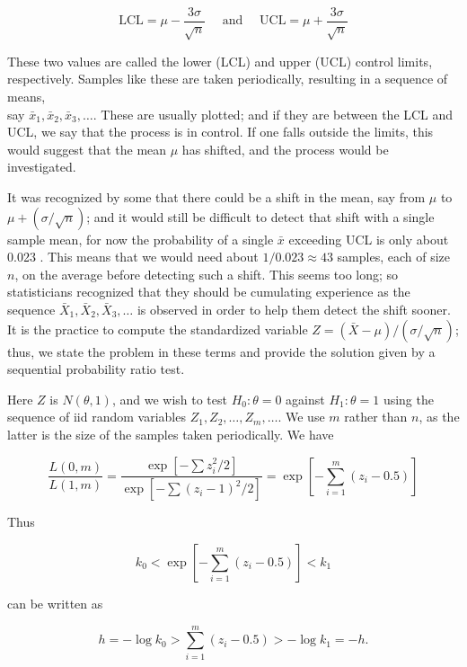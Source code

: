 $$
\mathrm{LCL}=\mu-\frac{3 \sigma}{\sqrt{n}} \quad \text { and } \quad \mathrm{UCL}=\mu+\frac{3 \sigma}{\sqrt{n}}
$$

These two values are called the lower (LCL) and upper (UCL) control limits, respectively. Samples like these are taken periodically, resulting in a sequence of means,\\
say $\bar{x}_{1}, \bar{x}_{2}, \bar{x}_{3}, \ldots$. These are usually plotted; and if they are between the LCL and UCL, we say that the process is in control. If one falls outside the limits, this would suggest that the mean $\mu$ has shifted, and the process would be investigated.

It was recognized by some that there could be a shift in the mean, say from $\mu$ to $\mu+(\sigma / \sqrt{n})$; and it would still be difficult to detect that shift with a single sample mean, for now the probability of a single $\bar{x}$ exceeding UCL is only about 0.023 . This means that we would need about $1 / 0.023 \approx 43$ samples, each of size $n$, on the average before detecting such a shift. This seems too long; so statisticians recognized that they should be cumulating experience as the sequence $\bar{X}_{1}, \bar{X}_{2}, \bar{X}_{3}, \ldots$ is observed in order to help them detect the shift sooner. It is the practice to compute the standardized variable $Z=(\bar{X}-\mu) /(\sigma / \sqrt{n})$; thus, we state the problem in these terms and provide the solution given by a sequential probability ratio test.

Here $Z$ is $N(\theta, 1)$, and we wish to test $H_{0}: \theta=0$ against $H_{1}: \theta=1$ using the sequence of iid random variables $Z_{1}, Z_{2}, \ldots, Z_{m}, \ldots$. We use $m$ rather than $n$, as the latter is the size of the samples taken periodically. We have

$$
\frac{L(0, m)}{L(1, m)}=\frac{\exp \left[-\sum z_{i}^{2} / 2\right]}{\exp \left[-\sum\left(z_{i}-1\right)^{2} / 2\right]}=\exp \left[-\sum_{i=1}^{m}\left(z_{i}-0.5\right)\right]
$$

Thus

$$
k_{0}<\exp \left[-\sum_{i=1}^{m}\left(z_{i}-0.5\right)\right]<k_{1}
$$

can be written as

$$
h=-\log k_{0}>\sum_{i=1}^{m}\left(z_{i}-0.5\right)>-\log k_{1}=-h .
$$

